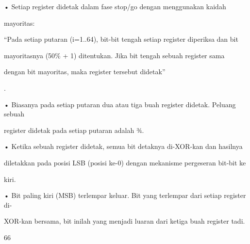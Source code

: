 \documentclass{article}
\begin{document}

• Setiap register didetak dalam fase stop/go dengan menggunakan kaidah 

mayoritas:  

       “Pada setiap putaran (i=1..64), bit-bit tengah setiap register diperiksa dan bit 

mayoritasnya (50\% + 1) ditentukan. Jika bit  tengah sebuah register sama 

dengan bit mayoritas, maka register tersebut  didetak”

. 

• Biasanya pada setiap putaran dua atau tiga buah register didetak. Peluang sebuah 

register didetak pada setiap putaran adalah ¾. 

• Ketika sebuah register didetak, semua bit detaknya di-XOR-kan dan hasilnya 

diletakkan pada posisi LSB (posisi ke-0) dengan mekanisme pergeseran bit-bit ke 

kiri. 

• Bit paling kiri (MSB) terlempar keluar. Bit yang terlempar dari setiap register di-

XOR-kan bersama, bit inilah yang menjadi luaran dari ketiga buah register tadi. 

66
\end{document}
